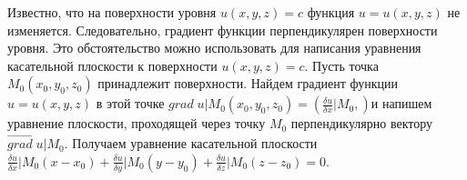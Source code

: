 \documentclass[a4paper,14pt]{article}
\begin{document}
    $\;$

    Известно, что на поверхности уровня $u(x,y,z)=c$ функция $u=u(x,y,z)$ не изменяется. 
    Следовательно, градиент функции перпендикулярен поверхности уровня. 
    Это обстоятельство можно использовать для написания уравнения касательной плоскости к поверхности $u(x,y,z)=c$. 
    Пусть точка $M_0(x_0,y_0,z_0)$ принадлежит поверхности. 
    Найдем градиент функции $u=u(x,y,z)$ в этой точке $grad\;u\vert{M_0(x_0,y_0,z_0)}=(\frac{\delta{u}}{\delta{x}}\vert{M_0,})$и напишем уравнение плоскости, 
    проходящей через точку $M_0$ перпендикулярно вектору $\vec{grad\;u}\vert{M_0}$. Получаем уравнение касательной плоскости 
    $\frac{\delta{u}}{\delta{x}}\vert{M_0}(x-x_0)+\frac{\delta{u}}{\delta{y}}\vert{M_0}(y-y_0)+\frac{\delta{u}}{\delta{z}}\vert{M_0}(z-z_0)=0$.
\end{document}

